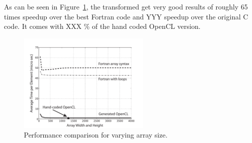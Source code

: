 As can be seen in Figure~\ref{fig:cl-performance}, the transformed get very
good results of roughly 65 times speedup over the best Fortran code and YYY
speedup over the original C code.  It comes with XXX \% of the hand coded
OpenCL version.

\begin{figure}[!t]
\centering
\includegraphics[width=2.5in]{cl-performance.pdf}
\caption{Performance comparison for varying array size.}
\label{fig:cl-performance}
\end{figure}
